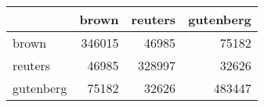\begin{tabular}{lrrr}
\hline
           &   brown &   reuters &   gutenberg \\
\hline
 brown     &  346015 &     46985 &       75182 \\
 reuters   &   46985 &    328997 &       32626 \\
 gutenberg &   75182 &     32626 &      483447 \\
\hline
\end{tabular}